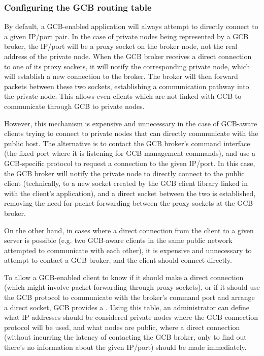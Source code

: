 \subsubsection{\label{sec:GCB-routing-table}Configuring the GCB
  routing table} 

By default, a GCB-enabled application will always attempt to directly
connect to a given IP/port pair.
In the case of private nodes being represented by a GCB broker, the
IP/port will be a proxy socket on the broker node, not the real
address of the private node.
When the GCB broker receives a direct connection to one of its proxy 
sockets, it will notify the corresponding private node, which will
establish a new connection to the broker.
The broker will then forward packets between these two sockets,
establishing a communication pathway into the private node.
This allows even clients which are not linked with GCB to communicate
through GCB to private nodes.

However, this mechanism is expensive and unnecessary in the case of
GCB-aware clients trying to connect to private nodes that can directly
communicate with the public host.
The alternative is to contact the GCB broker's command interface (the
fixed port where it is listening for GCB management commands), and use
a GCB-specific protocol to request a connection to the given IP/port.
In this case, the GCB broker will notify the private node to directly
connect to the public client (technically, to a new socket created by
the GCB client library linked in with the client's application), and a
direct socket between the two is established, removing the need for
packet forwarding between the proxy sockets at the GCB broker.

On the other hand, in cases where a direct connection from the client
to a given server is possible (e.g. two GCB-aware clients in the same
public network attempted to communicate with each other), it is
expensive and unnecessary to attempt to contact a GCB broker, and the
client should connect directly.

To allow a GCB-enabled client to know if it should make a direct
connection (which might involve packet forwarding through proxy
sockets), or if it should use the GCB protocol to communicate with the
broker's command port and arrange a direct socket,
GCB provides a .
Using this table, an administrator can define what IP addresses should
be considered private nodes where the GCB connection protocol will be
used, and what nodes are public, where a direct connection (without
incurring the latency of contacting the GCB broker, only to find out
there's no information about the given IP/port) should be made
immediately. 

